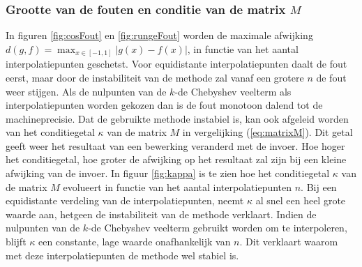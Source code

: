 \documentclass[a4paper, 12pt, titlepage, fleqn]{article}
\begin{document}
\subsubsection{Grootte van de fouten en conditie van de matrix $M$}
In figuren \ref{fig:cosFout} en \ref{fig:rungeFout} worden de maximale afwijking $d(g,f) = \max_{x\in [-1,1]} | g(x) - f(x)|$, in functie van het aantal interpolatiepunten geschetst. Voor equidistante interpolatiepunten daalt de fout eerst, maar door de instabiliteit van de methode zal vanaf een grotere $n$ de fout weer stijgen. Als de nulpunten van de $k$-de Chebyshev veelterm als interpolatiepunten worden gekozen dan is de fout monotoon dalend tot de machineprecisie. Dat de gebruikte methode instabiel is, kan ook afgeleid worden van het conditiegetal $\kappa$ van de matrix $M$ in vergelijking (\ref{eq:matrixM}). Dit getal geeft weer het resultaat van een bewerking veranderd met de invoer. Hoe hoger het conditiegetal, hoe groter de afwijking op het resultaat zal zijn bij een kleine afwijking van de invoer. In figuur \ref{fig:kappa} is te zien hoe het conditiegetal $\kappa$ van de matrix $M$ evolueert in functie van het aantal interpolatiepunten $n$. Bij een equidistante verdeling van de interpolatiepunten, neemt $\kappa$ al snel een heel grote waarde aan, hetgeen de instabiliteit van de methode verklaart. Indien de nulpunten van de $k$-de Chebyshev veelterm gebruikt worden om te interpoleren, blijft $\kappa$ een constante, lage waarde onafhankelijk van $n$. Dit verklaart waarom met deze interpolatiepunten de methode wel stabiel is.
\end{document}
